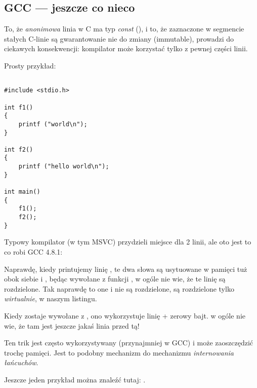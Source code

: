 \subsection{GCC --- jeszcze co nieco}
\label{use_parts_of_C_strings}

To, że \emph{anonimowa} linia w C ma typ \emph{const} (), 
i to, że zaznaczone w segmencie stałych C-linie są gwarantowanie nie do zmiany (immutable), 
prowadzi do ciekawych konsekwencji: kompilator może korzystać tylko z pewnej części linii.

Prosty przykład:

\begin{lstlisting}[style=customc]

#include <stdio.h>

int f1()
{
	printf ("world\n");
}

int f2()
{
	printf ("hello world\n");
}

int main()
{
	f1();
	f2();
}
\end{lstlisting}

Typowy kompilator \CCpp (w tym MSVC) przydzieli miejsce dla 2 linii, ale oto jest to co robi GCC 4.8.1:



Naprawdę, kiedy printujemy linię , 
te dwa słowa są usytuowane w pamięci tuż obok siebie i \puts, będąc wywołane z funkcji , w ogóle nie wie,
że te linię są rozdzielone. Tak naprawdę to one i nie są rozdzielone, są rozdzielone 
tylko \emph{wirtualnie}, w naszym listingu.

Kiedy \puts zostaje wywołane z , ono wykorzystuje linię  + zerowy bajt. \puts w ogóle nie wie, że tam jest jeszcze jakaś linia przed tą!

Ten trik jest często wykorzystywany (przynajmniej w GCC) i może zaoszczędzić trochę pamięci.
Jest to podobny mechanizm do mechanizmu \emph{internowania łańcuchów}.

Jeszcze jeden przykład można znaleźć tutaj: .


